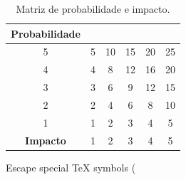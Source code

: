  	\begin{table}[]
\centering
\caption{Matriz de probabilidade e impacto.}
\label{tab:matriz_probabilidade_impacto}
\begin{tabular}{|c|ccccc}
\cline{1-1}
\textbf{Probabilidade} &                                                &                                                 &                                                 &                                                 &                                                 \\ \hline
5             & \multicolumn{1}{c|}{\cellcolor[HTML]{34FF34}5} & \multicolumn{1}{c|}{\cellcolor[HTML]{F8FF00}10} & \multicolumn{1}{c|}{\cellcolor[HTML]{FE0000}15} & \multicolumn{1}{c|}{\cellcolor[HTML]{FE0000}20} & \multicolumn{1}{c|}{\cellcolor[HTML]{FE0000}25} \\ \hline
4             & \multicolumn{1}{c|}{\cellcolor[HTML]{34FF34}4} & \multicolumn{1}{c|}{\cellcolor[HTML]{F8FF00}8}  & \multicolumn{1}{c|}{\cellcolor[HTML]{F8FF00}12} & \multicolumn{1}{c|}{\cellcolor[HTML]{FE0000}16} & \multicolumn{1}{c|}{\cellcolor[HTML]{FE0000}20} \\ \hline
3             & \multicolumn{1}{c|}{\cellcolor[HTML]{34FF34}3} & \multicolumn{1}{c|}{\cellcolor[HTML]{F8FF00}6}  & \multicolumn{1}{c|}{\cellcolor[HTML]{F8FF00}9}  & \multicolumn{1}{c|}{\cellcolor[HTML]{F8FF00}12} & \multicolumn{1}{c|}{\cellcolor[HTML]{FE0000}15} \\ \hline
2             & \multicolumn{1}{c|}{\cellcolor[HTML]{34FF34}2} & \multicolumn{1}{c|}{\cellcolor[HTML]{34FF34}4}  & \multicolumn{1}{c|}{\cellcolor[HTML]{F8FF00}6}  & \multicolumn{1}{c|}{\cellcolor[HTML]{F8FF00}8}  & \multicolumn{1}{c|}{\cellcolor[HTML]{F8FF00}10} \\ \hline
1             & \multicolumn{1}{c|}{\cellcolor[HTML]{34FF34}1} & \multicolumn{1}{c|}{\cellcolor[HTML]{34FF34}2}  & \multicolumn{1}{c|}{\cellcolor[HTML]{34FF34}3}  & \multicolumn{1}{c|}{\cellcolor[HTML]{34FF34}4}  & \multicolumn{1}{c|}{\cellcolor[HTML]{34FF34}5}  \\ \hline
\textbf{Impacto}       & \multicolumn{1}{c|}{1}                         & \multicolumn{1}{c|}{2}                          & \multicolumn{1}{c|}{3}                          & \multicolumn{1}{c|}{4}                          & \multicolumn{1}{c|}{5}                          \\ \hline
\end{tabular}
\end{table}

Escape special TeX symbols (%

